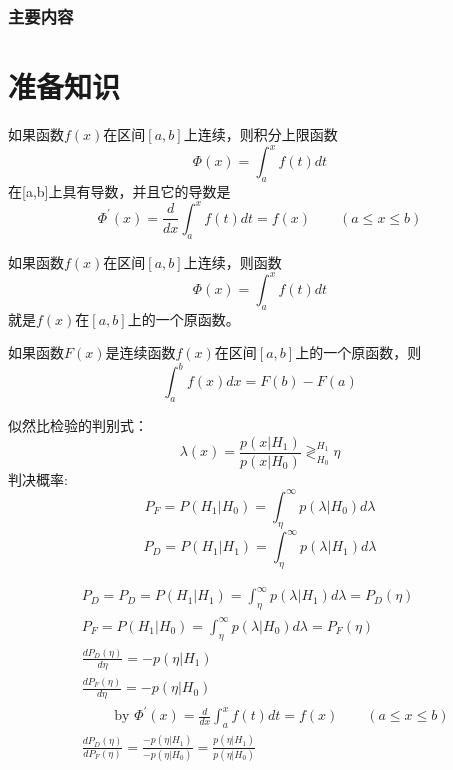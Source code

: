 \begin{frame}
  \frametitle{主要内容}
  \tableofcontents[hideallsubsections]
\end{frame}

\section{准备知识}
\begin{frame}
\begin{theorem}
	如果函数$f(x)$在区间$[a,b]$上连续，则积分上限函数
	\[\Phi(x)=\int_a^x f(t)dt\]
	在[a,b]上具有导数，并且它的导数是
	\[\Phi^\prime(x)=\frac{d}{dx}\int_a^xf(t)dt=f(x)\qquad (a\le x\le b) \]
\end{theorem}
\begin{theorem}
	如果函数$f(x)$在区间$[a,b]$上连续，则函数
	\[\Phi(x)=\int_a^x f(t)dt\]	
	就是$f(x)$在$[a,b]$上的一个原函数。
\end{theorem}
\end{frame}

\begin{frame}
\begin{theorem}
	如果函数$F(x)$是连续函数$f(x)$在区间$[a,b]$上的一个原函数，则
	\[\int_a^b f(x)dx=F(b)-F(a)\]	
\end{theorem}
\end{frame}

\begin{frame}
似然比检验的判别式：
\[\lambda(x)=\frac{p(x|H_1)}{p(x|H_0)}\mathop{\gtrless}_{H_0}^{H_1}\eta \]
判决概率:
\[P_F=P(H_1|H_0)=\int_{\eta}^{\infty}p(\lambda|H_0)d\lambda \]
\[P_D=P(H_1|H_1)=\int_{\eta}^{\infty}p(\lambda|H_1)d\lambda \]
\end{frame}

\begin{frame}
\begin{align*}
&P_D =P_D=P(H_1|H_1)=\int_{\eta}^{\infty}p(\lambda|H_1)d\lambda=P_D(\eta) \\
&P_F =P(H_1|H_0)=\int_{\eta}^{\infty}p(\lambda|H_0)d\lambda=P_F(\eta) \\
&\frac{dP_D(\eta)}{d\eta} =-p(\eta|H_1) \\ 
&\frac{dP_F(\eta)}{d\eta} =-p(\eta|H_0) \\ 
&\qquad \text{ by } \Phi^\prime(x)=\frac{d}{dx}\int_a^xf(t)dt=f(x)\qquad (a\le x\le b) \\
&\frac{dP_D(\eta)}{dP_F(\eta)} =\frac{-p(\eta|H_1)}{-p(\eta|H_0)}=\frac{p(\eta|H_1)}{p(\eta|H_0)}\\
\end{align*}
\end{frame}

